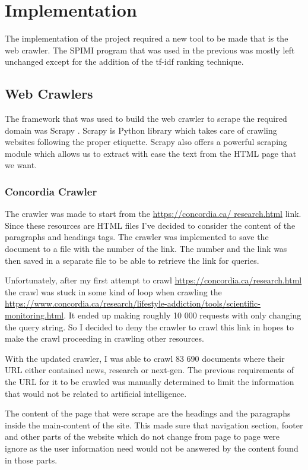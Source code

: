 \chapter{Implementation}

The implementation of the project required a new tool to be made that is the web crawler. The SPIMI program that was used in the previous was mostly left unchanged except for the addition of the tf-idf ranking technique.

\section{Web Crawlers}

\par The framework that was used to build the web crawler to scrape the required domain was Scrapy \cite{scrapy}. Scrapy is Python library which takes care of crawling websites following the proper etiquette. Scrapy also offers a powerful scraping module which allows us to extract with ease the text from the HTML page that we want.

\subsection{Concordia Crawler}

\par The crawler was made to start from the \url{https://concordia.ca/ research.html} link. Since these resources are HTML files I've decided to consider the content of the paragraphs and headings tags. The crawler was implemented to save the document to a file with the number of the link. The number and the link was then saved in a separate file to be able to retrieve the link for queries.
\par Unfortunately, after my first attempt to crawl \url{https://concordia.ca/research.html} the crawl was stuck in some kind of loop when crawling the \url{https://www.concordia.ca/research/lifestyle-addiction/tools/scientific-monitoring.html}. It ended up making roughly 10 000 requests with only changing the query string. So I decided to deny the crawler to crawl this link in hopes to make the crawl proceeding in crawling other resources.
\par With the updated crawler, I was able to crawl 83 690 documents where their URL either contained news, research or next-gen. The previous requirements of the URL for it to be crawled was manually determined to limit the information that would not be related to artificial intelligence.
\par The content of the page that were scrape are the headings and the paragraphs inside the main-content of the site. This made sure that navigation section, footer and other parts of the website which do not change from page to page were ignore as the user information need would not be answered by the content found in those parts.

